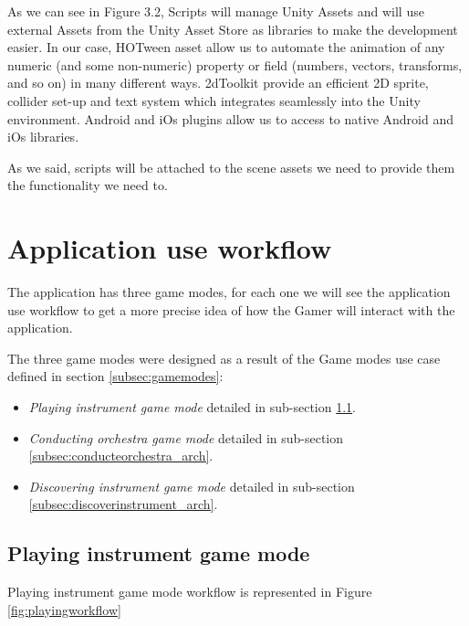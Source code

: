 As we can see in Figure 3.2, Scripts will manage Unity Assets and will use external Assets from the Unity Asset Store as libraries to make the development easier. In our case, HOTween asset allow us to automate the animation of any numeric (and some non-numeric) property or field (numbers, vectors, transforms, and so on) in many different ways. 2dToolkit provide an efficient 2D sprite, collider set-up and text system which integrates seamlessly into the Unity environment. Android and iOs plugins allow us to access to native Android and iOs libraries.

As we said, scripts will be attached to the scene assets we need to provide them the functionality we need to.


\section{Application use workflow}
The application has three game modes, for each one we will see the application use workflow to get a more precise idea of how the Gamer will interact with the application.

The three game modes were designed as a result of the Game modes use case defined in section \ref{subsec:gamemodes}:

\begin{itemize}
\item \textit{Playing instrument game mode} detailed in sub-section \ref{subsec:playinstrument_arch}.
\item \textit{Conducting orchestra game mode} detailed in sub-section \ref{subsec:conducteorchestra_arch}.
\item \textit{Discovering instrument game mode}  detailed in sub-section \ref{subsec:discoverinstrument_arch}.
\end{itemize}

\newpage
\subsection{Playing instrument game mode}
\label{subsec:playinstrument_arch}

Playing instrument game mode workflow is represented in Figure \ref{fig:playingworkflow}


